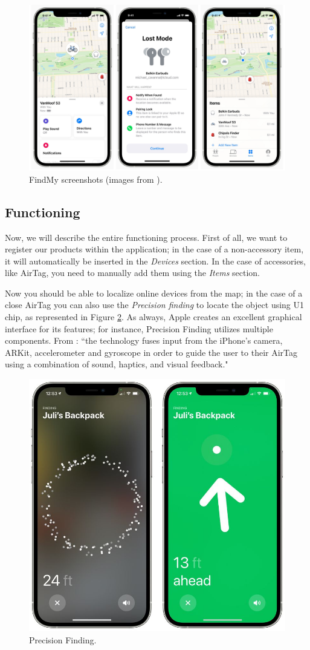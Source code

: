 \documentclass[english]{article}
\begin{document}
\begin{figure}[t]
	\centering
	\includegraphics[width=.9\textwidth]{images/findmy.jpg}
	\caption{FindMy screenshots (images from \cite{findmyscreen}).}
	\label{findmy2}
\end{figure}

\subsection{Functioning}
Now, we will describe the entire functioning process. First of all, we want to register our products within the application; in the case of a non-accessory item, it will automatically be inserted in the \textit{Devices} section. In the case of accessories, like AirTag, you need to manually add them using the \textit{Items} section.

Now you should be able to localize online devices from the map; in the case of a close AirTag you can also use the \textit{Precision finding} to locate the object using U1 chip, as represented in Figure \ref{findmy1}. As always, Apple creates an excellent graphical interface for its features; for instance, Precision Finding utilizes multiple components. From \cite{OBoyle_2021}: ``the technology fuses input from the iPhone's camera, ARKit, accelerometer and gyroscope in order to guide the user to their AirTag using a combination of sound, haptics, and visual feedback." 

\begin{figure}[t]
	\centering
	\includegraphics[width=.6\textwidth]{images/airtag-precision-finding-2.jpg}
	\caption{Precision Finding.}
	\label{findmy1}
\end{figure}
\end{document}
